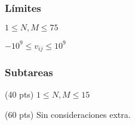 \subsubsection*{Límites}

\begin{plimits}
	\item \(1\leq N, M\leq 75 \)
	\item \(-10^9\leq v_{ij}\leq 10^9 \)
\end{plimits}

\subsubsection*{Subtareas}

\begin{plimits}
	\item (40 pts) \(1\leq N, M\leq 15 \)
	\item (60 pts) Sin consideraciones extra.
\end{plimits}
